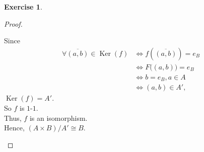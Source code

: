 \documentclass{amsart}
\renewcommand{\ker}{\operatorname{Ker}}
\theoremstyle{plain}
\theoremstyle{definition}
\newtheorem{exer}[lem]{Exercise}
\begin{document}
\begin{exer}
\begin{enumerate}[(a)]
\begin{proof}
\begin{enumerate}[(i)]
			Since
			\begin{align*}
				\forall \overline{(a,b)} \in \ker(f) & \Longleftrightarrow f(\overline{(a,b)}) = e_B\\
													& \Longleftrightarrow F\big((a,b)\big) = e_B \\
													& \Longleftrightarrow b = e_B, a \in A\\
													& \Longleftrightarrow (a,b) \in A', 
			\end{align*}
			$\ker(f) = A'$.\\			
			So $f$ is $1$-$1$.\\
			Thus, $f$ is an isomorphism. \\
			Hence, $(A\times B)/A'\cong B$.

		\end{enumerate}
	\end{proof}
\end{enumerate}
\end{exer}
\end{document}
